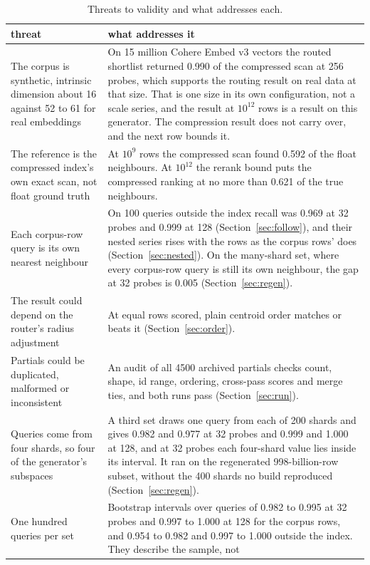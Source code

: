 \documentclass[sigconf, nonacm]{acmart}
\begin{document}
\begin{table}[t]
\caption{Threats to validity and what addresses each.}
\label{tab:threats}
\centering
\small
\begin{tabular}{p{}p{}}
\toprule
threat & what addresses it \\
\midrule
The corpus is synthetic, intrinsic dimension about 16 against 52 to 61 for real embeddings &
On 15 million Cohere Embed v3 vectors the routed shortlist returned 0.990 of the compressed scan at
256 probes, which supports the routing result on real data at that size. That is one size in its
own configuration, not a scale series, and the result at $10^{12}$ rows is a result on this
generator. The compression result does not carry over, and the next row bounds it. \\
The reference is the compressed index's own exact scan, not float ground truth &
At $10^{9}$ rows the compressed scan found 0.592 of the float neighbours. At $10^{12}$ the rerank
bound puts the compressed ranking at no more than 0.621 of the true neighbours. \\
Each corpus-row query is its own nearest neighbour &
On 100 queries outside the index recall was 0.969 at 32 probes and 0.999 at 128
(Section~\ref{sec:follow}), and their nested series rises with the rows as the corpus rows' does
(Section~\ref{sec:nested}). On the many-shard set, where every corpus-row query is still its own
neighbour, the gap at 32 probes is 0.005 (Section~\ref{sec:regen}). \\
The result could depend on the router's radius adjustment &
At equal rows scored, plain centroid order matches or beats it (Section~\ref{sec:order}). \\
Partials could be duplicated, malformed or inconsistent &
An audit of all 4500 archived partials checks count, shape, id range, ordering, cross-pass scores
and merge ties, and both runs pass (Section~\ref{sec:run}). \\
Queries come from four shards, so four of the generator's subspaces &
A third set draws one query from each of 200 shards and gives 0.982 and 0.977 at 32 probes
and 0.999 and 1.000 at 128, and at 32 probes each four-shard value lies inside its
interval. It ran on the regenerated 998-billion-row subset, without the 400 shards no build
reproduced (Section~\ref{sec:regen}). \\
One hundred queries per set &
Bootstrap intervals over queries of 0.982 to 0.995 at 32 probes and 0.997 to 1.000 at 128 for the
corpus rows, and 0.954 to 0.982 and 0.997 to 1.000 outside the index. They describe the sample, not

\end{tabular}
\end{table}
\end{document}
